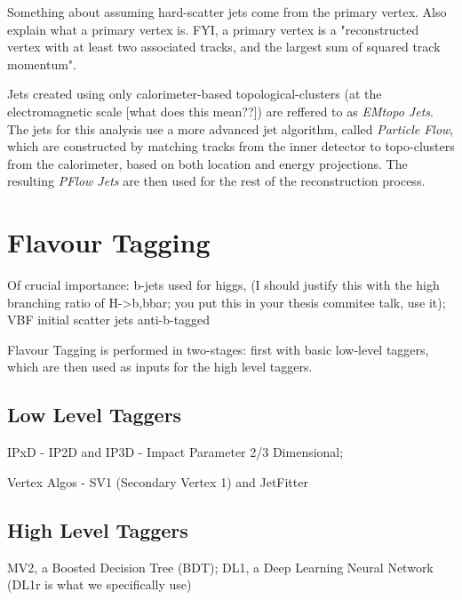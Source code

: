         Something about assuming hard-scatter jets come from the primary vertex.
        Also explain what a primary vertex is.
        FYI, a primary vertex is a "reconstructed vertex with at least two associated tracks, and the largest sum of squared track momentum".
        \cite{jet_energy_scale13TeV}



        Jets created using only calorimeter-based topological-clusters (at the electromagnetic scale [what does this mean??]) %
            are reffered to as \textit{EMtopo Jets}.
        The jets for this analysis use a more advanced jet algorithm, called \textit{Particle Flow},
            which are constructed by matching tracks from the inner detector to topo-clusters from the calorimeter,
            based on both location and energy projections.
        The resulting \textit{PFlow Jets} are then used for the rest of the reconstruction process.
        \cite{pflow}

    \section{Flavour Tagging}
        Of crucial importance:
            b-jets used for higgs,
                (I should justify this with the high branching ratio of H->b,bbar;
                you put this in your thesis commitee talk, use it);
            VBF initial scatter jets anti-b-tagged

        Flavour Tagging is performed in two-stages:
            first with basic low-level taggers,
            which are then used as inputs for the high level taggers.

        \subsection{Low Level Taggers}

            IPxD - IP2D and IP3D - Impact Parameter 2/3 Dimensional; 

            Vertex Algos - SV1 (Secondary Vertex 1) and JetFitter
            \cite{thesis_giacinto}

        \subsection{High Level Taggers}

            MV2, a Boosted Decision Tree (BDT);
            DL1, a Deep Learning Neural Network (DL1r is what we specifically use)
            \cite{bjet_id_and_performance}
            \cite{btagging_optimisation}


